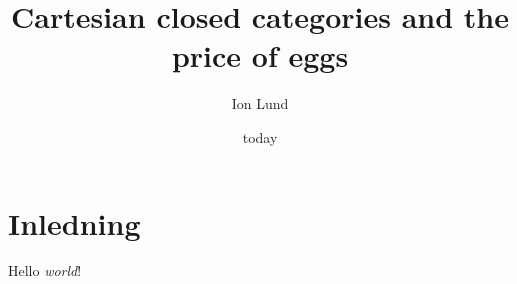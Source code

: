 \documentclass{article}
\title{Cartesian closed categories and the price of eggs}
\author{Ion Lund}
\date{today}
\begin{document}
    \maketitle
    \section{Inledning}
        Hello \emph{world}!
\end{document}
